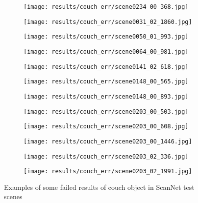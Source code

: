 \begin{figure}[h!]
  \centering
  \begin{subfigure}[b]{0.32\linewidth}
    \texttt{[image: results/couch\_err/scene0234\_00\_368.jpg]}
  \end{subfigure}
  \begin{subfigure}[b]{0.32\linewidth}
    \texttt{[image: results/couch\_err/scene0031\_02\_1860.jpg]}
  \end{subfigure}
  \begin{subfigure}[b]{0.32\linewidth}
    \texttt{[image: results/couch\_err/scene0050\_01\_993.jpg]}
  \end{subfigure}
  \begin{subfigure}[b]{0.32\linewidth}
    \texttt{[image: results/couch\_err/scene0064\_00\_981.jpg]}
  \end{subfigure}
  \begin{subfigure}[b]{0.32\linewidth}
    \texttt{[image: results/couch\_err/scene0141\_02\_618.jpg]}
  \end{subfigure}
  \begin{subfigure}[b]{0.32\linewidth}
    \texttt{[image: results/couch\_err/scene0148\_00\_565.jpg]}
  \end{subfigure}
  \begin{subfigure}[b]{0.32\linewidth}
    \texttt{[image: results/couch\_err/scene0148\_00\_893.jpg]}
  \end{subfigure}
  \begin{subfigure}[b]{0.32\linewidth}
    \texttt{[image: results/couch\_err/scene0203\_00\_503.jpg]}
  \end{subfigure}
  \begin{subfigure}[b]{0.32\linewidth}
    \texttt{[image: results/couch\_err/scene0203\_00\_608.jpg]}
  \end{subfigure}
  \begin{subfigure}[b]{0.32\linewidth}
    \texttt{[image: results/couch\_err/scene0203\_00\_1446.jpg]}
  \end{subfigure}
  \begin{subfigure}[b]{0.32\linewidth}
    \texttt{[image: results/couch\_err/scene0203\_02\_336.jpg]}
  \end{subfigure}
  \begin{subfigure}[b]{0.32\linewidth}
    \texttt{[image: results/couch\_err/scene0203\_02\_1991.jpg]}
  \end{subfigure}
  \caption{Examples of some failed results of couch object in ScanNet test scenes}
  \label{fig:result_couch_err}
\end{figure}

